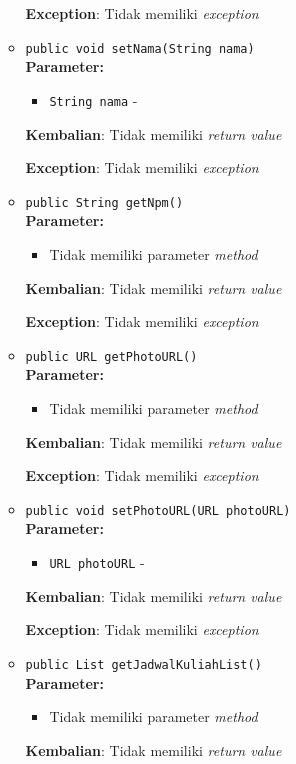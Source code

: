 \documentclass{article}
\begin{document}
\begin{enumerate}
\begin{itemize}
\textbf{Exception}: Tidak memiliki \textit{exception}

\item \texttt{public void setNama(String nama)}\\ 


\textbf{Parameter:}\begin{itemize}
\item \texttt{String nama} - 
\end{itemize}
\textbf{Kembalian}: Tidak memiliki \textit{return value}

\textbf{Exception}: Tidak memiliki \textit{exception}

\item \texttt{public String getNpm()}\\ 


\textbf{Parameter:}\begin{itemize}
\item Tidak memiliki parameter \textit{method}
\end{itemize}
\textbf{Kembalian}: Tidak memiliki \textit{return value}

\textbf{Exception}: Tidak memiliki \textit{exception}

\item \texttt{public URL getPhotoURL()}\\ 


\textbf{Parameter:}\begin{itemize}
\item Tidak memiliki parameter \textit{method}
\end{itemize}
\textbf{Kembalian}: Tidak memiliki \textit{return value}

\textbf{Exception}: Tidak memiliki \textit{exception}

\item \texttt{public void setPhotoURL(URL photoURL)}\\ 


\textbf{Parameter:}\begin{itemize}
\item \texttt{URL photoURL} - 
\end{itemize}
\textbf{Kembalian}: Tidak memiliki \textit{return value}

\textbf{Exception}: Tidak memiliki \textit{exception}

\item \texttt{public List getJadwalKuliahList()}\\ 


\textbf{Parameter:}\begin{itemize}
\item Tidak memiliki parameter \textit{method}
\end{itemize}
\textbf{Kembalian}: Tidak memiliki \textit{return value}


\end{itemize}
\end{enumerate}
\end{document}
